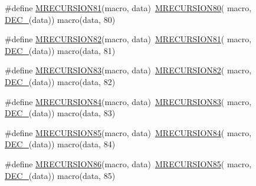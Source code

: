 \begin{DoxyCompactItemize}
\item 
\#define \mbox{\hyperlink{group__group__sam0__utils__mrecursion_gaa8cd222526861d88895eed35926c7745}{M\+R\+E\+C\+U\+R\+S\+I\+O\+N81}}(macro,  data)~\mbox{\hyperlink{group__group__sam0__utils__mrecursion_gaa1146bb36552aac6b2de5b2a51f0d08c}{M\+R\+E\+C\+U\+R\+S\+I\+O\+N80}}(  macro, \mbox{\hyperlink{group__group__sam0__utils__mrecursion_ga1d23d683797679dca8c3512a54a5dcae}{D\+E\+C\+\_\+}}(data))   macro(data, 80)
\item 
\#define \mbox{\hyperlink{group__group__sam0__utils__mrecursion_ga8ba880263ec8b032074474cb8514ef0c}{M\+R\+E\+C\+U\+R\+S\+I\+O\+N82}}(macro,  data)~\mbox{\hyperlink{group__group__sam0__utils__mrecursion_gaa8cd222526861d88895eed35926c7745}{M\+R\+E\+C\+U\+R\+S\+I\+O\+N81}}(  macro, \mbox{\hyperlink{group__group__sam0__utils__mrecursion_ga1d23d683797679dca8c3512a54a5dcae}{D\+E\+C\+\_\+}}(data))   macro(data, 81)
\item 
\#define \mbox{\hyperlink{group__group__sam0__utils__mrecursion_ga1f2ba2104038509ab3e8b791d2d21777}{M\+R\+E\+C\+U\+R\+S\+I\+O\+N83}}(macro,  data)~\mbox{\hyperlink{group__group__sam0__utils__mrecursion_ga8ba880263ec8b032074474cb8514ef0c}{M\+R\+E\+C\+U\+R\+S\+I\+O\+N82}}(  macro, \mbox{\hyperlink{group__group__sam0__utils__mrecursion_ga1d23d683797679dca8c3512a54a5dcae}{D\+E\+C\+\_\+}}(data))   macro(data, 82)
\item 
\#define \mbox{\hyperlink{group__group__sam0__utils__mrecursion_ga31ee69249c9a70670bb46444ee959831}{M\+R\+E\+C\+U\+R\+S\+I\+O\+N84}}(macro,  data)~\mbox{\hyperlink{group__group__sam0__utils__mrecursion_ga1f2ba2104038509ab3e8b791d2d21777}{M\+R\+E\+C\+U\+R\+S\+I\+O\+N83}}(  macro, \mbox{\hyperlink{group__group__sam0__utils__mrecursion_ga1d23d683797679dca8c3512a54a5dcae}{D\+E\+C\+\_\+}}(data))   macro(data, 83)
\item 
\#define \mbox{\hyperlink{group__group__sam0__utils__mrecursion_ga7f31385ab7859d5e8d37703595b2162a}{M\+R\+E\+C\+U\+R\+S\+I\+O\+N85}}(macro,  data)~\mbox{\hyperlink{group__group__sam0__utils__mrecursion_ga31ee69249c9a70670bb46444ee959831}{M\+R\+E\+C\+U\+R\+S\+I\+O\+N84}}(  macro, \mbox{\hyperlink{group__group__sam0__utils__mrecursion_ga1d23d683797679dca8c3512a54a5dcae}{D\+E\+C\+\_\+}}(data))   macro(data, 84)
\item 
\#define \mbox{\hyperlink{group__group__sam0__utils__mrecursion_gac51f17bf8f61be0fe68a40cdaca97002}{M\+R\+E\+C\+U\+R\+S\+I\+O\+N86}}(macro,  data)~\mbox{\hyperlink{group__group__sam0__utils__mrecursion_ga7f31385ab7859d5e8d37703595b2162a}{M\+R\+E\+C\+U\+R\+S\+I\+O\+N85}}(  macro, \mbox{\hyperlink{group__group__sam0__utils__mrecursion_ga1d23d683797679dca8c3512a54a5dcae}{D\+E\+C\+\_\+}}(data))   macro(data, 85)

\end{DoxyCompactItemize}
